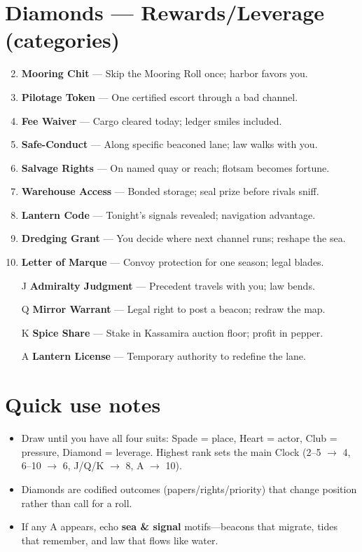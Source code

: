 \section*{Diamonds --- Rewards/Leverage (categories)}
\label{sec:kahfagia-rewards}
\begin{enumerate}
\setcounter{enumi}{1}
\item \textbf{Mooring Chit} --- Skip the Mooring Roll once; harbor favors you.
\item \textbf{Pilotage Token} --- One certified escort through a bad channel.
\item \textbf{Fee Waiver} --- Cargo cleared today; ledger smiles included.
\item \textbf{Safe-Conduct} --- Along specific beaconed lane; law walks with you.
\item \textbf{Salvage Rights} --- On named quay or reach; flotsam becomes fortune.
\item \textbf{Warehouse Access} --- Bonded storage; seal prize before rivals sniff.
\item \textbf{Lantern Code} --- Tonight's signals revealed; navigation advantage.
\item \textbf{Dredging Grant} --- You decide where next channel runs; reshape the sea.
\item \textbf{Letter of Marque} --- Convoy protection for one season; legal blades.
\item[J] \textbf{Admiralty Judgment} --- Precedent travels with you; law bends.
\item[Q] \textbf{Mirror Warrant} --- Legal right to post a beacon; redraw the map.
\item[K] \textbf{Spice Share} --- Stake in Kassamira auction floor; profit in pepper.
\item[A] \textbf{Lantern License} --- Temporary authority to redefine the lane.
\end{enumerate}

\section*{Quick use notes}
\label{sec:kahfagia-quick-use}
\begin{itemize}
\item Draw until you have all four suits: Spade = place, Heart = actor, Club = pressure, Diamond = leverage. Highest rank sets the main Clock (2--5 $\rightarrow$ 4, 6--10 $\rightarrow$ 6, J/Q/K $\rightarrow$ 8, A $\rightarrow$ 10).
\item Diamonds are codified outcomes (papers/rights/priority) that change position rather than call for a roll.
\item If any A appears, echo \textbf{sea \& signal} motifs---beacons that migrate, tides that remember, and law that flows like water.
\end{itemize}

